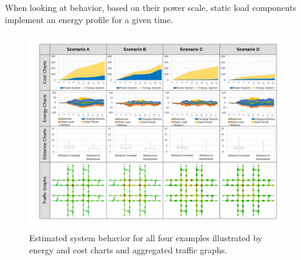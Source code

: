 



When looking at behavior, based on their power scale, static load components implement an energy profile for a given time. 

\begin{figure}[t]
	\centering
	\includegraphics[width=\textwidth]{../gfx/examples2.pdf}
	\caption{Estimated system behavior for all four examples illustrated by energy and cost charts and aggregated traffic graphs.}
	\label{figure:examples}
\end{figure}